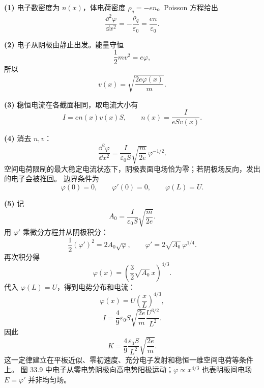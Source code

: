 \begin{xesolution}
\textbf{(1)} 电子数密度为 $n(x)$，体电荷密度 $\rho_q=-en$。Poisson 方程给出
\begin{equation}
  \frac{\dd^2\varphi}{\dd x^2}=-\frac{\rho_q}{\varepsilon_0}
  =\frac{en}{\varepsilon_0}.
\end{equation}

\textbf{(2)} 电子从阴极由静止出发。能量守恒
\[
  \frac12mv^2=e\varphi,
\]
所以
\begin{equation}
  \boxed{v(x)=\sqrt{\frac{2e\varphi(x)}m}}.
\end{equation}

\textbf{(3)} 稳恒电流在各截面相同，取电流大小有
\begin{equation}
  I=en(x)v(x)S,
  \qquad
  \boxed{n(x)=\frac{I}{eSv(x)}}.
\end{equation}

\textbf{(4)} 消去 $n,v$：
\begin{equation}
  \frac{\dd^2\varphi}{\dd x^2}
  =\frac{I}{\varepsilon_0S}\sqrt{\frac{m}{2e}}\,\varphi^{-1/2}.
\end{equation}
空间电荷限制的最大稳定电流状态下，阴极表面电场恰为零；若阴极场反向，发出的电子会被推回。
边界条件为
\begin{equation}
  \varphi(0)=0,
  \qquad \varphi'(0)=0,
  \qquad \varphi(L)=U.
\end{equation}

\textbf{(5)} 记
\[
  A_0=\frac{I}{\varepsilon_0S}\sqrt{\frac{m}{2e}}.
\]
用 $\varphi'$ 乘微分方程并从阴极积分：
\[
  \frac12(\varphi')^2=2A_0\sqrt\varphi,
  \qquad
  \varphi'=2\sqrt{A_0}\,\varphi^{1/4}.
\]
再次积分得
\[
  \varphi(x)=\left(\frac32\sqrt{A_0}\,x\right)^{4/3}.
\]
代入 $\varphi(L)=U$，得到电势分布和电流：
\begin{equation}
  \boxed{\varphi(x)=U\left(\frac xL\right)^{4/3}},
\end{equation}
\begin{equation}
  \boxed{I=\frac49\varepsilon_0S\sqrt{\frac{2e}{m}}
  \frac{U^{3/2}}{L^2}}.
\end{equation}
因此
\begin{equation}
  \boxed{K=\frac49\frac{\varepsilon_0S}{L^2}\sqrt{\frac{2e}{m}}}.
\end{equation}
这一定律建立在平板近似、零初速度、充分电子发射和稳恒一维空间电荷等条件上。
图 33.9 中电子从零电势阴极向高电势阳极运动；$\varphi\propto x^{4/3}$ 也表明板间电场
$E=\varphi'$ 并非均匀场。

\vacuumDiodeDiagram
\end{xesolution}

